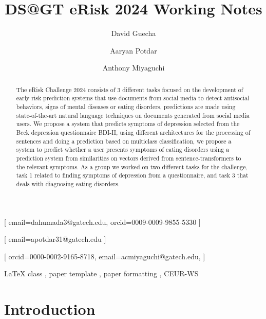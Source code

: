 \documentclass[]{style/ceurart}
\begin{document}


\title{DS@GT eRisk 2024 Working Notes}

\author[1]{David Guecha}[
email=dahumada3@gatech.edu,
orcid=0009-0009-9855-5330
]
\author[1]{Aaryan Potdar}[
email=apotdar31@gatech.edu
]
\author[1]{Anthony Miyaguchi}[
orcid=0000-0002-9165-8718,
email=acmiyaguchi@gatech.edu,
]
\cormark[1]

\address[1]{Georgia Institute of Technology, North Ave NW, Atlanta, GA 30332}


\begin{abstract}
The eRisk Challenge 2024 consists of 3 different tasks focused on the development of early risk prediction systems that use documents from social media to detect antisocial behaviors, signs of mental diseases or eating disorders, predictions are made using state-of-the-art natural language techniques on documents generated from social media users. We propose a system that predicts symptoms of depression selected from the Beck depression questionnaire BDI-II, using different architectures for the processing of sentences and doing a prediction based on multiclass classification, we propose a system to predict whether a user presents symptoms of eating disorders using a prediction system from similarities on vectors derived from sentence-transformers to the relevant symptoms. As a group we worked on two different tasks for the challenge, task 1 related to finding symptoms of depression from a questionnaire, and task 3 that deals with diagnosing eating disorders.

\end{abstract}

\begin{keywords}
  LaTeX class \sep
  paper template \sep
  paper formatting \sep
  CEUR-WS
\end{keywords}


\maketitle

\section{Introduction}
\end{document}

